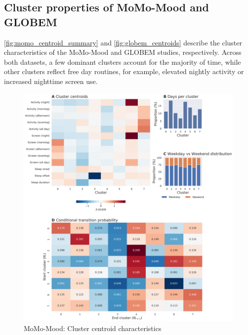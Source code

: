 \begin{appendices}
\FloatBarrier                 %

\clearpage
\section{Cluster properties of MoMo-Mood and GLOBEM}

\autoref{fig:momo_centroid_summary} and \autoref{fig:globem_centroids} describe the cluster characteristics of the MoMo-Mood and GLOBEM studies, respectively. Across both datasets, a few dominant clusters account for the majority of time, while other clusters reflect free day routines, for example, elevated nightly activity or increased nighttime screen use.

\begin{figure}[p]
  \centering
  \includegraphics[width=\linewidth]{figures/appendix/momo_summary.png}
  \caption{MoMo-Mood: Cluster centroid characteristics}
  \label{fig:momo_centroid_summary}
\end{figure}

\begin{figure}[p]
  \centering


\end{figure}
\end{appendices}
